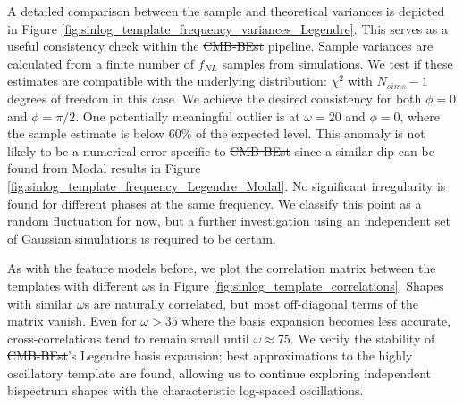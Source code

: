 \documentclass[a4paper,12pt,times,custombib,print,index]{Classes/PhDThesisPSnPDF} %
\providecommand{\DIFadd}[1]{{\protect\color{blue}\uwave{#1}}} %
\providecommand{\DIFdel}[1]{{\protect\color{red}\sout{#1}}}                      %
\providecommand{\DIFaddbegin}{} %
\providecommand{\DIFaddend}{} %
\providecommand{\DIFdelbegin}{} %
\providecommand{\DIFdelend}{} %
\newcommand{\DIFscaledelfig}{0.5}
\newlength{\DIFdelgraphicswidth} %
\newlength{\DIFdelgraphicsheight} %
\newcommand{\DIFaddincludegraphics}[2][]{{\color{blue}\fbox{\DIFOincludegraphics[#1]{#2}}}} %
\newcommand{\DIFdelincludegraphics}[2][]{%
\sbox{\DIFdelgraphicsbox}{\DIFOincludegraphics[#1]{#2}}%
\settoboxwidth{\DIFdelgraphicswidth}{\DIFdelgraphicsbox} %
\settoboxtotalheight{\DIFdelgraphicsheight}{\DIFdelgraphicsbox} %
\scalebox{\DIFscaledelfig}{%
\parbox[b]{\DIFdelgraphicswidth}{\usebox{\DIFdelgraphicsbox}\\[-\baselineskip] \rule{\DIFdelgraphicswidth}{0em}}\llap{\resizebox{\DIFdelgraphicswidth}{\DIFdelgraphicsheight}{%
\setlength{\unitlength}{\DIFdelgraphicswidth}%
\begin{picture}(1,1)%
\thicklines\linethickness{2pt} %
{\color[rgb]{1,0,0}\put(0,0){\framebox(1,1){}}}%
{\color[rgb]{1,0,0}\put(0,0){\line( 1,1){1}}}%
{\color[rgb]{1,0,0}\put(0,1){\line(1,-1){1}}}%
\end{picture}%
}\hspace*{3pt}}} %
} %
\DeclareRobustCommand{\DIFaddbegin}{\DIFOaddbegin \let\includegraphics\DIFaddincludegraphics} %
\DeclareRobustCommand{\DIFaddend}{\DIFOaddend \let\includegraphics\DIFOincludegraphics} %
\DeclareRobustCommand{\DIFdelbegin}{\DIFOdelbegin \let\includegraphics\DIFdelincludegraphics} %
\DeclareRobustCommand{\DIFdelend}{\DIFOaddend \let\includegraphics\DIFOincludegraphics} %
\begin{document}
A detailed comparison between the sample and theoretical variances is depicted in Figure \ref{fig:sinlog_template_frequency_variances_Legendre}. This serves as a useful consistency check within the \DIFdelbegin \DIFdel{CMB-BEst }\DIFdelend \DIFaddbegin \textsc{\DIFadd{CMB-BEst}} \DIFaddend pipeline. Sample variances are calculated from a finite number of \DIFdelbegin \DIFdel{$f_{NL}$ }\DIFdelend \DIFaddbegin \DIFadd{$f_\text{NL}$ }\DIFaddend samples from simulations. We test if these estimates are compatible with the underlying distribution: $\chi^2$ with \DIFdelbegin \DIFdel{$N_{sims}-1$ }\DIFdelend \DIFaddbegin \DIFadd{$N_\text{sims}-1$ }\DIFaddend degrees of freedom in this case. We achieve the desired consistency for both $\phi=0$ and $\phi=\pi/2$. One potentially meaningful outlier is at $\omega=20$ and $\phi=0$, where the sample estimate is below 60\% of the expected level. This anomaly is not likely to be a numerical error specific to \DIFdelbegin \DIFdel{CMB-BEst }\DIFdelend \DIFaddbegin \textsc{\DIFadd{CMB-BEst}} \DIFaddend since a similar dip can be found from Modal results in Figure \ref{fig:sinlog_template_frequency_Legendre_Modal}. No significant irregularity is found for different phases at the same frequency. We classify this point as a random fluctuation for now, but a further investigation using an independent set of Gaussian simulations is required to be certain.

As with the feature models before, we plot the correlation matrix between the templates with different $\omega$s in Figure \ref{fig:sinlog_template_correlations}. Shapes with similar $\omega$s are naturally correlated, but most off-diagonal terms of the matrix vanish. Even for $\omega > 35$ where the basis expansion becomes less accurate, cross-correlations tend to remain small until $\omega \approx 75$. We verify the stability of \DIFdelbegin \DIFdel{CMB-BEst}\DIFdelend \DIFaddbegin \textsc{\DIFadd{CMB-BEst}}\DIFaddend 's Legendre basis expansion; best approximations to the highly oscillatory template are found, allowing us to continue exploring independent bispectrum shapes with the characteristic log-spaced oscillations.
\end{document}
